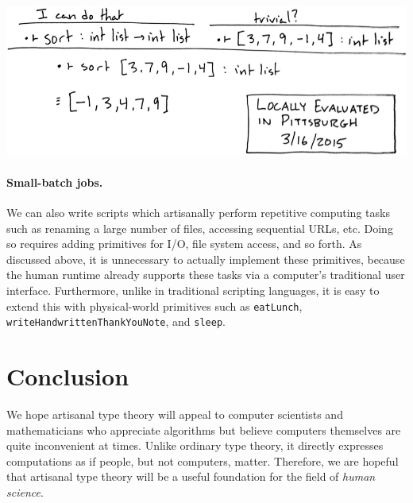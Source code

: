 \documentclass[10pt]{article}
\begin{document}
\vspace{1em}\noindent
\includegraphics[width=\textwidth]{sort.png}

\paragraph{Small-batch jobs.}
We can also write scripts which artisanally perform repetitive computing tasks
such as renaming a large number of files, accessing sequential URLs, etc. Doing
so requires adding primitives for I/O, file system access, and so forth. As
discussed above, it is unnecessary to actually implement these primitives,
because the human runtime already supports these tasks via a computer's
traditional user interface.
%
Furthermore, unlike in traditional scripting languages, it is easy to extend
this with physical-world primitives such as \texttt{eatLunch},
\texttt{writeHandwrittenThankYouNote}, and \texttt{sleep}.

\section{Conclusion}

We hope artisanal type theory will appeal to computer scientists and
mathematicians who appreciate algorithms but believe computers themselves are
quite inconvenient at times. Unlike ordinary type theory, it directly expresses
computations as if people, but not computers, matter. Therefore, we are hopeful
that artisanal type theory will be a useful foundation for the field of
\emph{human science}.

{}

\end{document}

